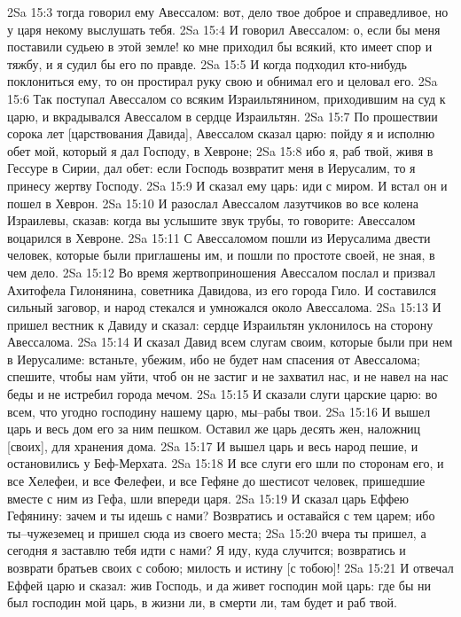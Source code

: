 2Sa 15:3  тогда говорил ему Авессалом: вот, дело твое доброе и справедливое, но у царя некому выслушать тебя.
2Sa 15:4  И говорил Авессалом: о, если бы меня поставили судьею в этой земле! ко мне приходил бы всякий, кто имеет спор и тяжбу, и я судил бы его по правде.
2Sa 15:5  И когда подходил кто-нибудь поклониться ему, то он простирал руку свою и обнимал его и целовал его.
2Sa 15:6  Так поступал Авессалом со всяким Израильтянином, приходившим на суд к царю, и вкрадывался Авессалом в сердце Израильтян.
2Sa 15:7  По прошествии сорока лет [царствования Давида], Авессалом сказал царю: пойду я и исполню обет мой, который я дал Господу, в Хевроне;
2Sa 15:8  ибо я, раб твой, живя в Гессуре в Сирии, дал обет: если Господь возвратит меня в Иерусалим, то я принесу жертву Господу.
2Sa 15:9  И сказал ему царь: иди с миром. И встал он и пошел в Хеврон.
2Sa 15:10  И разослал Авессалом лазутчиков во все колена Израилевы, сказав: когда вы услышите звук трубы, то говорите: Авессалом воцарился в Хевроне.
2Sa 15:11  С Авессаломом пошли из Иерусалима двести человек, которые были приглашены им, и пошли по простоте своей, не зная, в чем дело.
2Sa 15:12  Во время жертвоприношения Авессалом послал и призвал Ахитофела Гилонянина, советника Давидова, из его города Гило. И составился сильный заговор, и народ стекался и умножался около Авессалома.
2Sa 15:13  И пришел вестник к Давиду и сказал: сердце Израильтян уклонилось на сторону Авессалома.
2Sa 15:14  И сказал Давид всем слугам своим, которые были при нем в Иерусалиме: встаньте, убежим, ибо не будет нам спасения от Авессалома; спешите, чтобы нам уйти, чтоб он не застиг и не захватил нас, и не навел на нас беды и не истребил города мечом.
2Sa 15:15  И сказали слуги царские царю: во всем, что угодно господину нашему царю, мы--рабы твои.
2Sa 15:16  И вышел царь и весь дом его за ним пешком. Оставил же царь десять жен, наложниц [своих], для хранения дома.
2Sa 15:17  И вышел царь и весь народ пешие, и остановились у Беф-Мерхата.
2Sa 15:18  И все слуги его шли по сторонам его, и все Хелефеи, и все Фелефеи, и все Гефяне до шестисот человек, пришедшие вместе с ним из Гефа, шли впереди царя.
2Sa 15:19  И сказал царь Еффею Гефянину: зачем и ты идешь с нами? Возвратись и оставайся с тем царем; ибо ты--чужеземец и пришел сюда из своего места;
2Sa 15:20  вчера ты пришел, а сегодня я заставлю тебя идти с нами? Я иду, куда случится; возвратись и возврати братьев своих с собою; милость и истину [с тобою]!
2Sa 15:21  И отвечал Еффей царю и сказал: жив Господь, и да живет господин мой царь: где бы ни был господин мой царь, в жизни ли, в смерти ли, там будет и раб твой.
